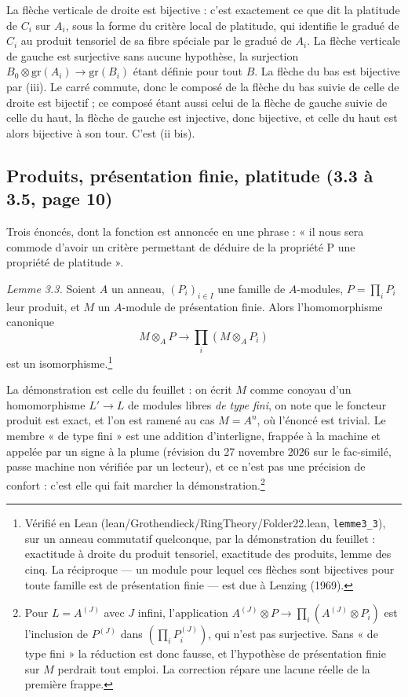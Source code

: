 \documentclass[11pt,a4paper]{article}
\begin{document}
La flèche verticale de droite est bijective : c'est exactement ce que dit la
platitude de $C_i$ sur $A_i$, sous la forme du critère local de platitude, qui
identifie le gradué de $C_i$ au produit tensoriel de sa fibre spéciale par le
gradué de $A_i$. La flèche verticale de gauche est surjective sans aucune
hypothèse, la surjection $B_0 \otimes \mathrm{gr}(A_i) \to \mathrm{gr}(B_i)$
étant définie pour tout $B$. La flèche du bas est bijective par (iii). Le carré
commute, donc le composé de la flèche du bas suivie de celle de droite est
bijectif ; ce composé étant aussi celui de la flèche de gauche suivie de celle
du haut, la flèche de gauche est injective, donc bijective, et celle du haut est
alors bijective à son tour. C'est (ii bis).

\subsection*{Produits, présentation finie, platitude (3.3 à 3.5, page 10)}

Trois énoncés, dont la fonction est annoncée en une phrase : « il nous sera
commode d'avoir un critère permettant de déduire de la propriété P une
propriété de platitude ».

\emph{Lemme 3.3.} Soient $A$ un anneau, $(P_i)_{i \in I}$ une famille de
$A$-modules, $P = \prod_i P_i$ leur produit, et $M$ un $A$-module de
présentation finie. Alors l'homomorphisme canonique
\[
  M \otimes_A P \longrightarrow \prod_i (M \otimes_A P_i)
\]
est un isomorphisme.\footnote{Vérifié en Lean (lean/Grothendieck/RingTheory/Folder22.lean,
\texttt{lemme3\_3}), sur un anneau commutatif quelconque, par la démonstration
du feuillet : exactitude à droite du produit tensoriel, exactitude des
produits, lemme des cinq. La réciproque --- un module pour lequel ces
flèches sont bijectives pour toute famille est de présentation finie --- est
due à Lenzing (1969).}

La démonstration est celle du feuillet : on écrit $M$ comme conoyau d'un
homomorphisme $L' \to L$ de modules libres \emph{de type fini}, on note que le
foncteur produit est exact, et l'on est ramené au cas $M = A^n$, où l'énoncé
est trivial. Le membre « de type fini » est une addition d'interligne, frappée
à la machine et appelée par un signe à la plume (révision du 27 novembre 2026 sur le fac-similé,
passe machine non vérifiée par un lecteur), et ce
n'est pas une précision de confort : c'est elle qui fait marcher la
démonstration.\footnote{Pour $L = A^{(J)}$ avec $J$ infini, l'application
$A^{(J)} \otimes P \to \prod_i (A^{(J)} \otimes P_i)$ est l'inclusion de
$P^{(J)}$ dans $(\prod_i P_i^{(J)})$, qui n'est pas surjective. Sans « de type
fini » la réduction est donc fausse, et l'hypothèse de présentation finie sur
$M$ perdrait tout emploi. La correction répare une lacune réelle de
la première frappe.}
\end{document}
